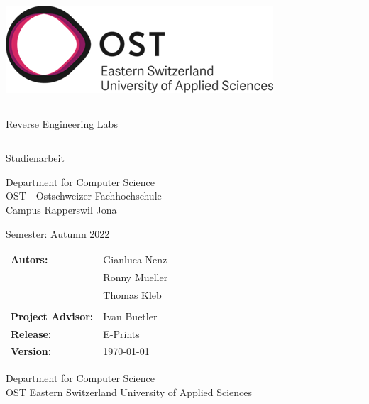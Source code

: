 \begin{titlepage}

    \begin{center}

        \includegraphics[height=0.15\textwidth, right]{resources/ost-logo.png}

        \vspace{3 cm}

        \hrule
        \vspace{0.8cm}
        {\Huge Reverse Engineering Labs}
        \vspace{0.8cm}
        \hrule
        \vspace{1cm}

        {\LARGE Studienarbeit}

         
        \vspace{1 cm}

        Department for Computer Science \\
        OST - Ostschweizer Fachhochschule \\
        Campus Rapperswil Jona \\

        \vspace{1 cm}

        Semester: Autumn 2022

        \vspace{3 cm}
        
        \begin{table}[h!]
            \centering
            \begin{tabular}{@{}ll}
                \textbf{Autors:}    & Gianluca Nenz \\
                                          & Ronny Mueller \\
                                          & Thomas Kleb \\
                                          &                    \\
                \textbf{Project Advisor:} & Ivan Buetler \\
                \textbf{Release:} & E-Prints \\
                \textbf{Version:} & \today
            \end{tabular}
        \end{table}
        

        \vfill


        \vspace{1cm}
        Department for Computer Science\\
        OST Eastern Switzerland University of Applied Sciences

    \end{center}

\end{titlepage}
